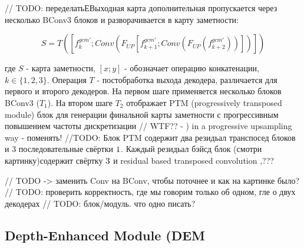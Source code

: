 // TODO: переделатьЕВыходная карта дополнительная пропускается через несколько BConv3 блоков и разворачивается в карту заметности:

\begin{equation}
    S = T([f_k^{gcm'}; Conv(F_{UP}[f_{k+1}^{gcm'}; Conv(F_{UP}(f_{k+2}^{gcm'}))])])
\end{equation}

где $S$ - карта заметности, $[x; y]$ - обозначает операцию конкатенации, $k \in \{1,2,3\}$. Операция $T$ - постобработка выхода декодера,
различается для первого и второго декодеров. На первом шаге применяется несколько блоков BConv3 ($T_1$). На втором шаге $T_2$ отображает 
PTM (progressively transposed module) блок для генерации финальной карты заметности с прогрессивным повышением частоты дискретизации // WTF?? - ) in a progressive upsampling way - поменять!
//TODO: Блок PTM содержит два резидьал  транспосед блоков и 3 последовательные свёртки $1 \time 1$. Каждый резидьал бэйсд блок (смотри картинку)содержит свёртку $3 \time 3$
и residual based transposed convolution ,???


// TODO -> заменить Conv на BConv, чтобы поточнее и как на картинке было?
// TODO: проверить корректность, где мы говорим только об одном, гле о двух декодерах
// TODO: блок/модуль. что одно писать? 


\subsection{Depth-Enhanced Module (DEM}

